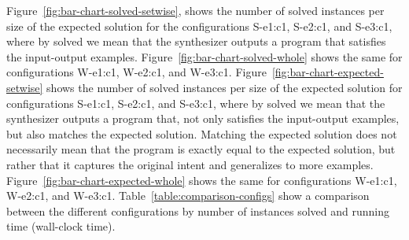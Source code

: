 Figure~\ref{fig:bar-chart-solved-setwise}, shows the number of solved instances
per size of the expected solution for the configurations S-e1:c1, S-e2:c1, and
S-e3:c1, where by solved we mean that the synthesizer outputs a program that
satisfies the input-output examples.
Figure~\ref{fig:bar-chart-solved-whole} shows the same for configurations
W-e1:c1, W-e2:c1, and W-e3:c1.
Figure~\ref{fig:bar-chart-expected-setwise} shows the number of solved instances
per size of the expected solution for configurations S-e1:c1, S-e2:c1, and
S-e3:c1, where by solved we mean that the synthesizer outputs a program that,
not only satisfies the input-output examples, but also matches the expected
solution.
Matching the expected solution does not necessarily mean that the program is
exactly equal to the expected solution, but rather that it captures the original
intent and generalizes to more examples.
Figure~\ref{fig:bar-chart-expected-whole} shows the same for configurations
W-e1:c1, W-e2:c1, and W-e3:c1.
Table~\ref{table:comparison-configs} show a comparison between the different
configurations by number of instances solved and running time (wall-clock time).

\begin{table}[]
  \noindent{}
  \caption{Comparison between the different configurations by number of instances
    solved and running time (wall-clock time).}
  \label{table:comparison-configs}
\end{table}

